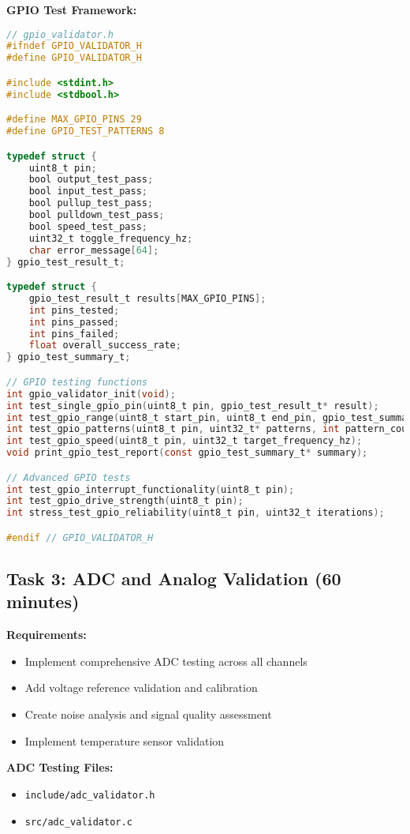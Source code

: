 \documentclass[11pt,a4paper]{article}
\begin{document}
\textbf{GPIO Test Framework:}
\begin{lstlisting}[language=C]
// gpio_validator.h
#ifndef GPIO_VALIDATOR_H
#define GPIO_VALIDATOR_H

#include <stdint.h>
#include <stdbool.h>

#define MAX_GPIO_PINS 29
#define GPIO_TEST_PATTERNS 8

typedef struct {
    uint8_t pin;
    bool output_test_pass;
    bool input_test_pass;
    bool pullup_test_pass;
    bool pulldown_test_pass;
    bool speed_test_pass;
    uint32_t toggle_frequency_hz;
    char error_message[64];
} gpio_test_result_t;

typedef struct {
    gpio_test_result_t results[MAX_GPIO_PINS];
    int pins_tested;
    int pins_passed;
    int pins_failed;
    float overall_success_rate;
} gpio_test_summary_t;

// GPIO testing functions
int gpio_validator_init(void);
int test_single_gpio_pin(uint8_t pin, gpio_test_result_t* result);
int test_gpio_range(uint8_t start_pin, uint8_t end_pin, gpio_test_summary_t* summary);
int test_gpio_patterns(uint8_t pin, uint32_t* patterns, int pattern_count);
int test_gpio_speed(uint8_t pin, uint32_t target_frequency_hz);
void print_gpio_test_report(const gpio_test_summary_t* summary);

// Advanced GPIO tests
int test_gpio_interrupt_functionality(uint8_t pin);
int test_gpio_drive_strength(uint8_t pin);
int stress_test_gpio_reliability(uint8_t pin, uint32_t iterations);

#endif // GPIO_VALIDATOR_H
\end{lstlisting}

\subsection{Task 3: ADC and Analog Validation (60 minutes)}

\textbf{Requirements:}
\begin{itemize}
    \item Implement comprehensive ADC testing across all channels
    \item Add voltage reference validation and calibration
    \item Create noise analysis and signal quality assessment
    \item Implement temperature sensor validation
\end{itemize}

\textbf{ADC Testing Files:}
\begin{itemize}
    \item \texttt{include/adc\_validator.h}
    \item \texttt{src/adc\_validator.c}
\end{itemize}
\end{document}
